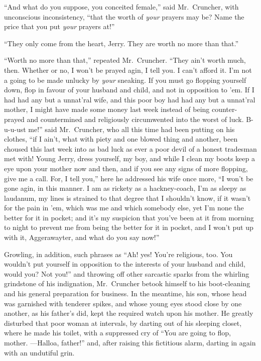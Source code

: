 ``And what do you suppose, you conceited female,'' said Mr.\ Cruncher,
with unconscious inconsistency, ``that the worth of \emph{your} prayers may be?
Name the price that you put \emph{your} prayers at!''

``They only come from the heart, Jerry.  They are worth no more than that.''

``Worth no more than that,'' repeated Mr.\ Cruncher.
``They ain't worth much, then.  Whether or no,
I won't be prayed agin, I tell you.  I can't afford it.
I'm not a going to be made unlucky by \emph{your} sneaking.
If you must go flopping yourself down, flop in favour
of your husband and child, and not in opposition to 'em. If I
had had any but a unnat'ral wife, and this poor boy had had any but
a unnat'ral mother, I might have made some money last week instead
of being counter-prayed and countermined and religiously circumwented
into the worst of luck.  B-u-u-ust me!'' said Mr.\ Cruncher, who all
this time had been putting on his clothes, ``if I ain't, what with
piety and one blowed thing and another, been choused this last week
into as bad luck as ever a poor devil of a honest tradesman met with!
Young Jerry, dress yourself, my boy, and while I clean my boots keep
a eye upon your mother now and then, and if you see any signs of more
flopping, give me a call.  For, I tell you,'' here he addressed his
wife once more, ``I won't be gone agin, in this manner.  I am as
rickety as a hackney-coach, I'm as sleepy as laudanum, my lines is
strained to that degree that I shouldn't know, if it wasn't for the
pain in 'em, which was me and which somebody else, yet I'm none the
better for it in pocket; and it's my suspicion that you've been at it
from morning to night to prevent me from being the better for it in pocket,
and I won't put up with it, Aggerawayter, and what do you say now!''

Growling, in addition, such phrases as ``Ah! yes!  You're religious, too.
You wouldn't put yourself in opposition to the interests of your husband
and child, would you?  Not you!'' and throwing off other sarcastic sparks
from the whirling grindstone of his indignation, Mr.\ Cruncher betook
himself to his boot-cleaning and his general preparation for business.
In the meantime, his son, whose head was garnished with tenderer spikes,
and whose young eyes stood close by one another, as his father's did,
kept the required watch upon his mother.  He greatly disturbed that
poor woman at intervals, by darting out of his sleeping closet,
where he made his toilet, with a suppressed cry of ``You are going to flop,
mother.  ---Halloa, father!'' and, after raising this fictitious alarm,
darting in again with an undutiful grin.

